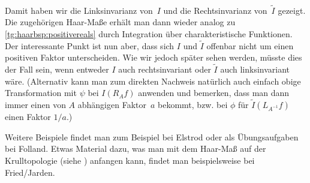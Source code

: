 \begin{BspList}[\label{tg:haarbsp}]
\begin{align*}
    \end{align*}
    Damit haben wir die Linksinvarianz von~$I$ und die Rechtsinvarianz
    von~$\tilde I$ gezeigt. Die zugehörigen Haar-Maße erhält man dann wieder
    analog zu \ref{tg:haarbsp:positivereals} durch Integration über
    charakteristische Funktionen. Der interessante Punkt ist nun aber, dass sich
    $I$ und $\tilde I$ offenbar nicht um einen positiven Faktor unterscheiden.
    Wie wir jedoch später 
    sehen werden, müsste dies der Fall sein, wenn entweder $I$ auch
    rechtsinvariant oder $\tilde I$ auch linksinvariant wäre.
    (Alternativ kann man zum direkten Nachweis natürlich auch einfach obige
    Transformation mit $\psi$ bei $I(R_Af)$ anwenden und bemerken, dass man dann
    immer einen von $A$ abhängigen Faktor~$a$ bekommt, bzw. bei $\phi$ für
    $\tilde I(L_{A^{-1}}f)$ einen Faktor $1/a$.)
    
\end{BspList}
%
Weitere Beispiele findet man zum Beispiel bei
Elstrod\cite[Kap.\,VIII,\;\S3,~und~3.14]{bookc:elstrod11}
oder als Übungsaufgaben bei 
Folland\cite[\S11,,\;Exercises]{bookc:folland99}.
%
Etwas Material dazu, was man mit dem Haar-Maß auf der Krulltopologie (siehe
) anfangen kann, findet man beispielsweise bei
Fried/Jarden\cite[Ch.\,18,~insb.\,18.5\,ff.]{bookc:fried05}.


































